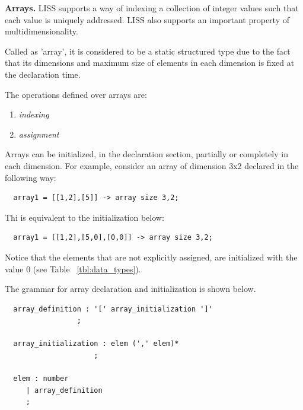 \documentclass[
  oneside,
  11pt, a4paper,
  footinclude=true,
  headinclude=true,
  cleardoublepage=empty
]{scrbook}
\begin{document}
\bigbreak

\textbf{Arrays.}
LISS supports a way of indexing a collection of integer values such that each value is uniquely addressed. LISS also supports an important property of multidimensionality.

Called as 'array', it is considered to be a static structured type due to the fact that its dimensions and maximum size of elements in each dimension is fixed at the declaration time.


The operations defined over arrays are:

\begin{enumerate}
\item \textit{indexing} %
\item \textit{assignment} %
\end{enumerate}


Arrays can be initialized, in the declaration section, partially or completely in each dimension.
For example, consider an array of dimension 3x2 declared in the following way:

\begin{lstlisting}
  array1 = [[1,2],[5]] -> array size 3,2;
\end{lstlisting} 

Thi is equivalent to the initialization below:

\begin{lstlisting}
  array1 = [[1,2],[5,0],[0,0]] -> array size 3,2;
\end{lstlisting}

Notice that the elements that are not explicitly assigned, are initialized with the value 0 (see Table ~\ref{tbl:data_types}).

The grammar for array declaration and initialization is shown below.

\begin{lstlisting}
  array_definition : '[' array_initialization ']'
                 ;

  array_initialization : elem (',' elem)*
                     ;

  elem : number
     | array_definition
     ;
\end{lstlisting}

\bigbreak
\end{document}
